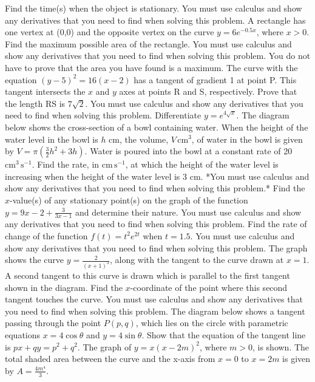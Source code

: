 \documentclass[12pt,addpoints]{exam}
\begin{document}
\begin{questions}
Find the time(s) when the object is stationary. You must use calculus and show any derivatives that you need to find when solving this problem.
\fillwithlines{5cm}
\question[5] A rectangle has one vertex at (0,0) and the opposite vertex on the curve \( y = 6e^{-0.5x} \), where \( x > 0 \). Find the maximum possible area of the rectangle. You must use calculus and show any derivatives that you need to find when solving this problem. You do not have to prove that the area you have found is a maximum.
\fillwithlines{5cm}
\question[5] The curve with the equation \((y - 5)^2 = 16(x - 2)\) has a tangent of gradient 1 at point P. This tangent intersects the \(x\) and \(y\) axes at points R and S, respectively. Prove that the length RS is \(7\sqrt{2}\). You must use calculus and show any derivatives that you need to find when solving this problem.
\fillwithlines{5cm}
\question[5] Differentiate \( y = e^{4\sqrt{x}} \).
\fillwithlines{5cm}
\question[5] The diagram below shows the cross-section of a bowl containing water. When the height of the water level in the bowl is \( h \) cm, the volume, \( V \, \text{cm}^3 \), of water in the bowl is given by \( V = \pi \left( \frac{3}{2} h^2 + 3h \right) \). Water is poured into the bowl at a constant rate of 20 \(\text{cm}^3 \, \text{s}^{-1}\). Find the rate, in \(\text{cm} \, \text{s}^{-1}\), at which the height of the water level is increasing when the height of the water level is 3 cm. *You must use calculus and show any derivatives that you need to find when solving this problem.*
\fillwithlines{5cm}
\question[5] Find the \( x \)-value(s) of any stationary point(s) on the graph of the function \( y = 9x - 2 + \frac{3}{3x - 1} \) and determine their nature. You must use calculus and show any derivatives that you need to find when solving this problem.
\fillwithlines{5cm}
\question[5] Find the rate of change of the function \( f(t) = t^2 e^{2t} \) when \( t = 1.5 \). You must use calculus and show any derivatives that you need to find when solving this problem.
\fillwithlines{5cm}
\question[5] The graph shows the curve \( y = \frac{2}{(x+1)^3} \), along with the tangent to the curve drawn at \( x = 1 \). A second tangent to this curve is drawn which is parallel to the first tangent shown in the diagram. Find the \( x \)-coordinate of the point where this second tangent touches the curve. You must use calculus and show any derivatives that you need to find when solving this problem.
\fillwithlines{5cm}
\question[5] The diagram below shows a tangent passing through the point \( P(p, q) \), which lies on the circle with parametric equations \( x = 4 \cos \theta \) and \( y = 4 \sin \theta \). Show that the equation of the tangent line is \( px + qy = p^2 + q^2 \).
\fillwithlines{5cm}
\question[5] The graph of \( y = x(x - 2m)^2 \), where \( m > 0 \), is shown. The total shaded area between the curve and the x-axis from \( x = 0 \) to \( x = 2m \) is given by \( A = \frac{4m^4}{3} \).


\end{questions}
\end{document}
